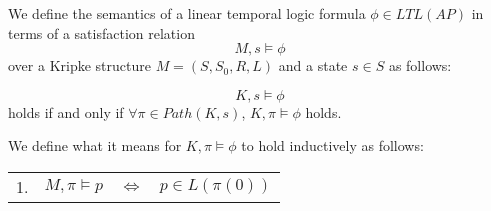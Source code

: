  \medskip
\begin{mydef}
We define the semantics of a linear temporal logic formula $\phi \in LTL(AP)$ in terms of a satisfaction relation $$M,s \models \phi$$ over a Kripke structure $M = (S, S_0,R,L)$ and a state $s \in S$ as follows:

$$K,s \models \phi$$ holds if and only if $\forall \pi \in Path(K, s)$, $K,\pi \models \phi$ holds.

We define what it means for $K, \pi \models \phi$ to hold inductively as follows:

\begin{comment}

\begin{itemize} 
\item $K,\pi \models \phi$ always holds.

\item For all propositional formulae $p \in AP$ the following always holds:
     $$K,\pi \models p \leftrightarrow p \in L(\pi(0))$$

\item For all LTL formulas $\mathbf{X} \phi \in LTL(K)$ the following always holds:
$$ K, \pi \models \mathbf{X} \phi \leftrightarrow K, succ;\pi \models \phi $$

where $succ$ is a successor function $succ: N \_ \to N$ such that $succ;\pi(n) = \pi(succ(n)) = \pi(n + 1)$.

\item For all LTL formulas $\phi \mathbf{U} \psi \in LTL(K)$ the following always holds:
$$K, \pi \models_{LTL} \phi \mathbf{U} \psi \leftrightarrow$$
$$\exists n \in N.$$
$$(K,succ^n; \pi \models_{LTL} \psi) \wedge (\forall m \in N. m < n \to K, succ^m;\i \models_{LTL} \phi)$$

\item For all LTL formulas $\neg \phi \in LTL(AP)$ the following always holds:
$$K,\pi \models_{LTL} \neg \phi \leftrightarrow K,\pi \not\models \phi $$

\item For all LTL formulas $\phi \vee \psi \in LTL(AP)$ the following always holds
$$K,\pi \models_{LTL} \phi \vee \psi \leftrightarrow K,\pi \models_{LTL} \phi \ \mathrm{or} \ K,\pi \models_{LTL} \psi $$

\end{itemize}

\end{comment}

\begin{center}
\begin{tabular}{l | l  c  l}
1. & $M, \pi \models p$  & $\Leftrightarrow$ & $p \in L(\pi(0))$ \\


\end{tabular}
\end{center}
\end{mydef}
